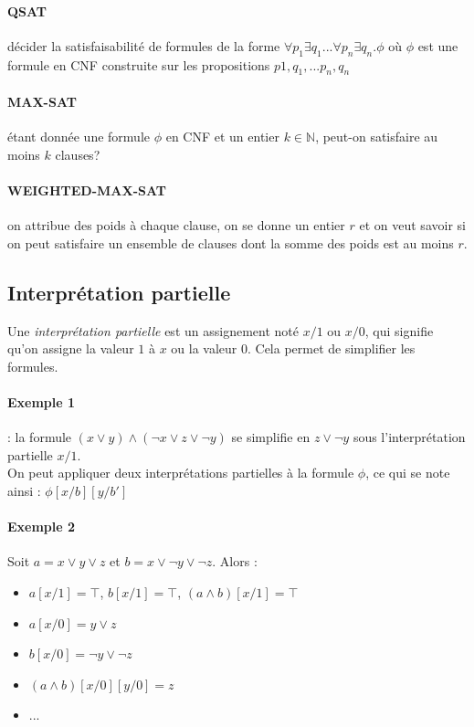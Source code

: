 \documentclass[a4paper]{article}
\begin{document}
    \paragraph{QSAT} 
    décider la satisfaisabilité de formules de la forme $\forall p_1 
\exists q_1 ... \forall p_n \exists q_n.\phi$
    où $\phi$ est une formule en CNF construite sur les propositions 
$p1, q_1, ... p_n, q_n$

    \paragraph{MAX-SAT} étant donnée une formule $\phi$ en CNF et un 
entier $k \in \mathbb{N}$, 
    peut-on satisfaire au moins $k$ clauses?

    \paragraph{WEIGHTED-MAX-SAT} on attribue des poids à chaque clause, 
on se donne
    un entier $r$ et on veut savoir si on peut satisfaire un ensemble de 
clauses dont la 
    somme des poids est au moins $r$.

  \subsection{Interprétation partielle}
  Une \textit{interprétation partielle} est un assignement noté $x/1$ ou 
$x/0$, 
  qui signifie qu'on assigne la valeur $1$ à $x$ ou la valeur $0$. Cela 
permet
  de simplifier les formules. 

    \paragraph{Exemple 1} : la formule $(x \lor y) \land (\lnot x \lor z 
\lor \lnot y)$ se simplifie
    en $z \lor \lnot y $ sous l'interprétation partielle $x/1$.\\

  On peut appliquer deux interprétations partielles à la formule $\phi$, 
ce qui se
  note ainsi : $\phi[x/b][y/b']$

    \paragraph{Exemple 2} Soit $a = x \lor y \lor z$ et $b = x \lor 
\lnot y \lor \lnot z$. Alors :
    \begin{itemize}
      \item $a[x/1] = \top$, $b[x/1] = \top$, $(a \land b)[x/1] = \top$
      \item $a[x/0] = y \lor z$
      \item $b[x/0] = \lnot y \lor \lnot z$
      \item $(a \land b)[x/0][y/0] = z$
      \item ...
    \end{itemize}
\end{document}
